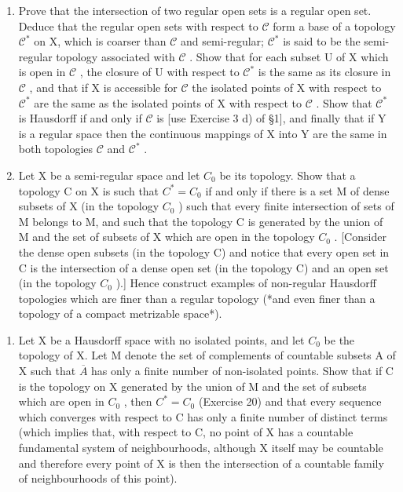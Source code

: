 \begin{enumerate}
\def\labelenumi{\alph{enumi})}
\setcounter{enumi}{1}
\item
  Prove that the intersection of two regular open sets is a regular open set. Deduce that the regular open sets with respect to \(\mathcal{C}\) form a base of a topology \(\mathcal{C}^*\) on X, which is coarser than \(\mathcal{C}\) and semi-regular; \(\mathcal{C}^*\) is said to be the semi-regular topology associated with \(\mathcal{C}\) . Show that for each subset U of X which is open in \(\mathcal{C}\) , the closure of U with respect to \(\mathcal{C}^*\) is the same as its closure in \(\mathcal{C}\) , and that if X is accessible for \(\mathcal{C}\) the isolated points of X with respect to \(\mathcal{C}^*\) are the same as the isolated points of X with respect to \(\mathcal{C}\) . Show that \(\mathcal{C}^*\) is Hausdorff if and only if \(\mathcal{C}\) is {[}use Exercise 3 d) of §1{]}, and finally that if Y is a regular space then the continuous mappings of X into Y are the same in both topologies \(\mathcal{C}\) and \(\mathcal{C}^*\) .
\item
  Let X be a semi-regular space and let \(C_{0}\) be its topology. Show that a topology C on X is such that \(C^{*} = C_{0}\) if and only if there is a set M of dense subsets of X (in the topology \(C_{0}\) ) such that every finite intersection of sets of M belongs to M, and such that the topology C is generated by the union of M and the set of subsets of X which are open in the topology \(C_{0}\) . {[}Consider the dense open subsets (in the topology C) and notice that every open set in C is the intersection of a dense open set (in the topology C) and an open set (in the topology \(C_{0}\) ).{]} Hence construct examples of non-regular Hausdorff topologies which are finer than a regular topology (*and even finer than a topology of a compact metrizable space*).
\end{enumerate}

\begin{enumerate}
\def\labelenumi{\arabic{enumi})}
\setcounter{enumi}{20}
\tightlist
\item
  Let X be a Hausdorff space with no isolated points, and let \(C_{0}\) be the topology of X. Let M denote the set of complements of countable subsets A of X such that \(\overline{A}\) has only a finite number of non-isolated points. Show that if C is the topology on X generated by the union of M and the set of subsets which are open in \(C_{0}\) , then \(C^{*} = C_{0}\) (Exercise 20) and that every sequence which converges with respect to C has only a finite number of distinct terms (which implies that, with respect to C, no point of X has a countable fundamental system of neighbourhoods, although X itself may be countable and therefore every point of X is then the intersection of a countable family of neighbourhoods of this point).
\end{enumerate}


